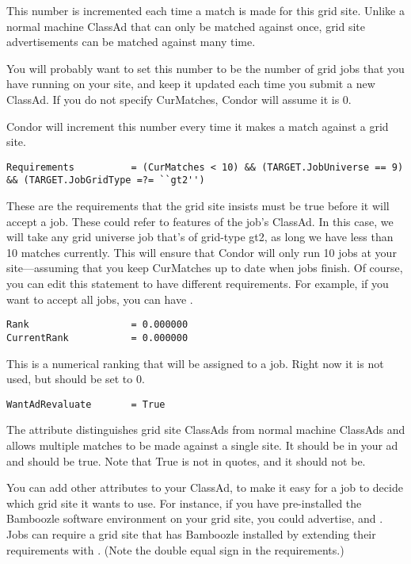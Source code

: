 This number is incremented each time a match is made for this grid
site. Unlike a normal machine ClassAd that can only be matched against
once, grid site advertisements can be matched against many time. 

You will probably want to set this number to be the number of grid
jobs that you have running on your site, and keep it updated each time
you submit a new ClassAd. If you do not specify CurMatches, Condor
will assume it is 0.

Condor will increment this number every time it makes a match against
a grid site.

\footnotesize
\begin{verbatim}
Requirements          = (CurMatches < 10) && (TARGET.JobUniverse == 9) && (TARGET.JobGridType =?= ``gt2'')
\end{verbatim}
\normalsize

These are the requirements that the grid site insists must be true
before it will accept a job. These could refer to features of the
job's ClassAd. In this case, we will take any grid universe job that's
of grid-type gt2, as
long we have less than 10 matches currently. This will ensure that
Condor will only run 10 jobs at your site---assuming that you keep
CurMatches up to date when jobs finish. Of course, you can edit this
statement to have different requirements. For example, if you want to
accept all jobs, you can have .

\footnotesize
\begin{verbatim}
Rank                  = 0.000000
CurrentRank           = 0.000000
\end{verbatim}
\normalsize

This is a numerical ranking that will be assigned to a job. Right now
it is not used, but should be set to 0. 

\begin{verbatim}
WantAdRevaluate       = True
\end{verbatim}

The  attribute distinguishes grid site
ClassAds from normal machine ClassAds and allows multiple matches to
be made against a single site. It should be in your ad and should be
true. Note that True is not in quotes, and it should not be.

You can add other attributes to your ClassAd, to make it easy for a
job to decide which grid site it wants to use. For instance, if you
have pre-installed the Bamboozle software environment on your grid
site, you could advertise,  and
. Jobs can require a grid site that has
Bamboozle installed by extending their requirements with
. (Note the double equal sign in the
requirements.) 

